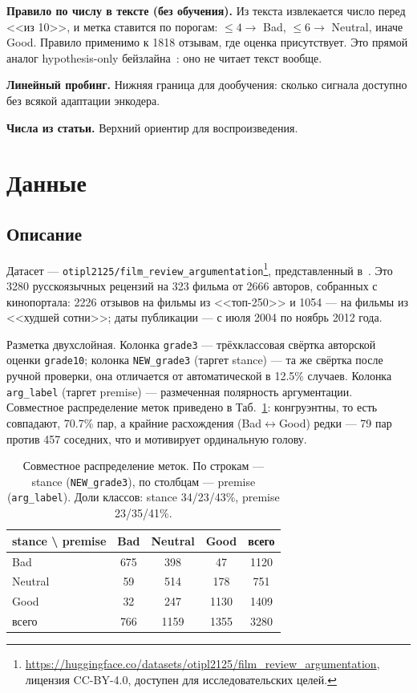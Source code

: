 \documentclass{article}
\begin{document}
\textbf{Правило по числу в тексте (без обучения).} Из текста извлекается число перед
<<из 10>>, и метка ставится по порогам: $\le 4 \to$ Bad, $\le 6 \to$ Neutral, иначе Good.
Правило применимо к 1818 отзывам, где оценка присутствует. Это прямой аналог
hypothesis-only бейзлайна~\cite{poliak2018hypothesis}: оно не читает текст вообще.

\textbf{Линейный пробинг.} Нижняя граница для дообучения: сколько сигнала доступно
без всякой адаптации энкодера.

\textbf{Числа из статьи.} Верхний ориентир для воспроизведения.

\section{Данные}

\subsection{Описание}

Датасет --- \texttt{otipl2125/film\_review\_argumentation}\footnote{\url{https://huggingface.co/datasets/otipl2125/film_review_argumentation},
лицензия CC-BY-4.0, доступен для исследовательских целей.}, представленный
в~\cite{serbina2026argument}. Это 3280 русскоязычных рецензий на 323 фильма от 2666 авторов,
собранных с кинопортала: 2226 отзывов на фильмы из <<топ-250>> и 1054 --- на фильмы из
<<худшей сотни>>; даты публикации --- с июля 2004 по ноябрь 2012 года.

Разметка двухслойная. Колонка \texttt{grade3} --- трёхклассовая свёртка авторской оценки
\texttt{grade10}; колонка \texttt{NEW\_grade3} (таргет stance) --- та же свёртка после
ручной проверки, она отличается от автоматической в 12.5\% случаев. Колонка
\texttt{arg\_label} (таргет premise) --- размеченная полярность аргументации.
Совместное распределение меток приведено в Таб.~\ref{tab:joint}: конгруэнтны, то есть
совпадают, 70.7\% пар, а крайние расхождения (Bad$\leftrightarrow$Good) редки ---
79 пар против 457 соседних, что и мотивирует ординальную голову.

\begin{table}[!tbh]
\begin{center}
\begin{tabular}[t]{|l|ccc|c|}
\hline
stance \textbackslash{} premise & Bad & Neutral & Good & всего \\
\hline
Bad     & 675 & 398 & 47   & 1120 \\
Neutral & 59  & 514 & 178  & 751  \\
Good    & 32  & 247 & 1130 & 1409 \\
\hline
всего   & 766 & 1159 & 1355 & 3280 \\
\hline
\end{tabular}
\caption{Совместное распределение меток. По строкам --- stance (\texttt{NEW\_grade3}),
по столбцам --- premise (\texttt{arg\_label}). Доли классов: stance 34/23/43\%,
premise 23/35/41\%.}
\label{tab:joint}
\end{center}
\end{table}
\end{document}
